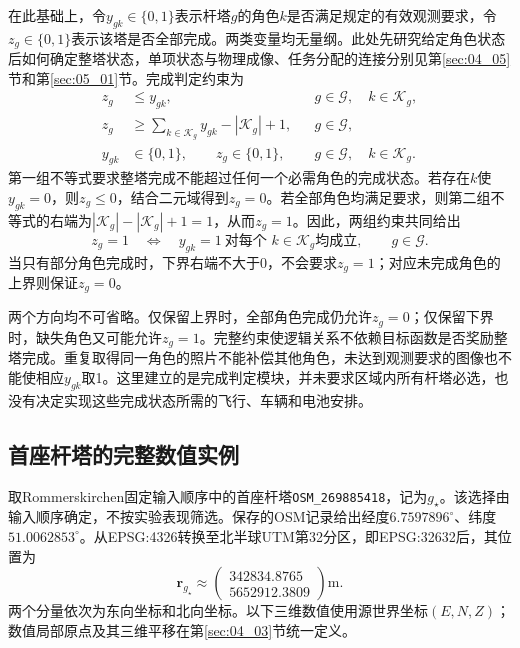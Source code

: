 在此基础上，令$y_{gk}\in\{0,1\}$表示杆塔$g$的角色$k$是否满足规定的有效观测要求，令$z_g\in\{0,1\}$表示该塔是否全部完成。两类变量均无量纲。此处先研究给定角色状态后如何确定整塔状态，单项状态与物理成像、任务分配的连接分别见第\ref{sec:04_05}节和第\ref{sec:05_01}节。完成判定约束为
\begin{subequations}
\begin{align}
 z_g&\leq y_{gk},
 &&g\in\mathcal G,\quad k\in\mathcal K_g,\\
 z_g&\geq\sum_{k\in\mathcal K_g}y_{gk}-|\mathcal K_g|+1,
 &&g\in\mathcal G,\\
 y_{gk}&\in\{0,1\},\qquad z_g\in\{0,1\},
 &&g\in\mathcal G,\quad k\in\mathcal K_g.
\end{align}
\end{subequations}
第一组不等式要求整塔完成不能超过任何一个必需角色的完成状态。若存在$k$使$y_{gk}=0$，则$z_g\leq0$，结合二元域得到$z_g=0$。若全部角色均满足要求，则第二组不等式的右端为$|\mathcal K_g|-|\mathcal K_g|+1=1$，从而$z_g=1$。因此，两组约束共同给出
\begin{equation}
 z_g=1
 \quad\Longleftrightarrow\quad
 y_{gk}=1\ \text{对每个 }k\in\mathcal K_g\text{均成立},
 \qquad g\in\mathcal G.
\end{equation}
当只有部分角色完成时，下界右端不大于0，不会要求$z_g=1$；对应未完成角色的上界则保证$z_g=0$。

两个方向均不可省略。仅保留上界时，全部角色完成仍允许$z_g=0$；仅保留下界时，缺失角色又可能允许$z_g=1$。完整约束使逻辑关系不依赖目标函数是否奖励整塔完成。重复取得同一角色的照片不能补偿其他角色，未达到观测要求的图像也不能使相应$y_{gk}$取1。这里建立的是完成判定模块，并未要求区域内所有杆塔必选，也没有决定实现这些完成状态所需的飞行、车辆和电池安排。

\subsection{首座杆塔的完整数值实例}

取Rommerskirchen固定输入顺序中的首座杆塔\texttt{OSM\_269885418}，记为$g_\star$。该选择由输入顺序确定，不按实验表现筛选。保存的OSM记录给出经度$6.7597896^{\circ}$、纬度$51.0062853^{\circ}$\cite{OSMData}。从EPSG:4326转换至北半球UTM第32分区，即EPSG:32632后\cite{PROJUTM}，其位置为
\begin{equation}
 \mathbf r_{g_\star}\approx
 \begin{pmatrix}
 342834.8765\\
 5652912.3809
 \end{pmatrix}\mathrm m.
\end{equation}
两个分量依次为东向坐标和北向坐标。以下三维数值使用源世界坐标$(E,N,Z)$；数值局部原点及其三维平移在第\ref{sec:04_03}节统一定义。

